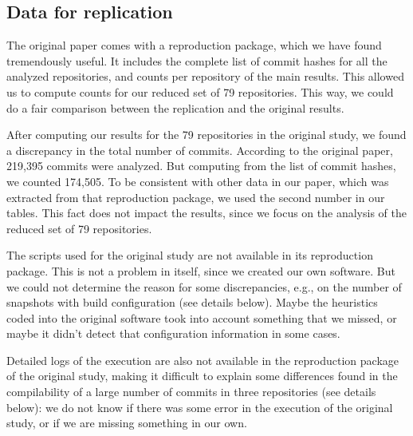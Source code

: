 
\subsection{Data for replication}

The original paper comes with a reproduction package, which we have found tremendously useful. It includes the complete list of commit hashes for all the analyzed repositories, and counts per repository of the main results. This allowed us to compute counts for our reduced set of 79 repositories. This way, we could do a fair comparison between the replication and the original results.

After computing our results for the 79 repositories in the original study, we found a discrepancy in the total number of commits. According to the original paper, 219,395 commits were analyzed. But computing from the list of commit hashes, we counted 174,505. To be consistent with other data in our paper, which was extracted from that reproduction package, we used the second number in our tables. This fact does not impact the results, since we focus on the analysis of the reduced set of 79 repositories.

The scripts used for the original study are not available in its reproduction package. This is not a problem in itself, since we created our own software. But we could not determine the reason for some discrepancies, e.g., on the number of snapshots with build configuration (see details below). Maybe the heuristics coded into the original software took into account something that we missed, or maybe it didn't detect that configuration information in some cases.

Detailed logs of the execution are also not available in the reproduction package of the original study, making it difficult to explain some differences found in the compilability of a large number of commits in three repositories (see details below): we do not know if there was some error in the execution of the original study, or if we are missing something in our own.

\vspace{0.3cm}

